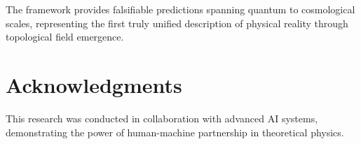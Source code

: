 \documentclass[11pt,a4paper]{article}
\begin{document}
The framework provides falsifiable predictions spanning quantum to cosmological scales, representing the first truly unified description of physical reality through topological field emergence.


\section*{Acknowledgments}


This research was conducted in collaboration with advanced AI systems, demonstrating the power of human-machine partnership in theoretical physics.




\end{document}
